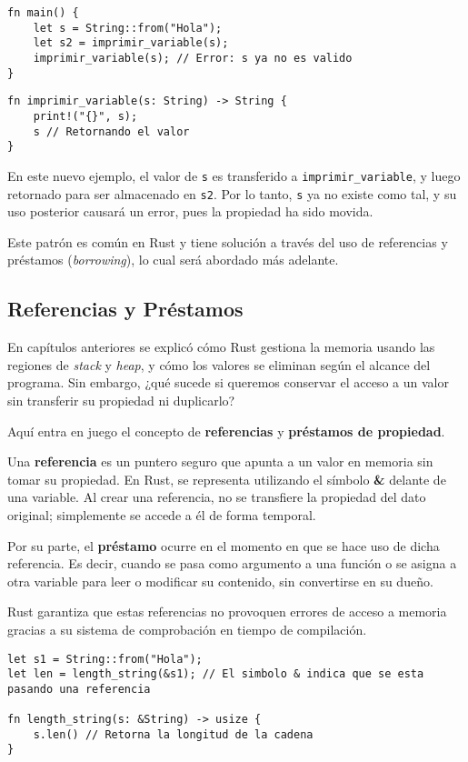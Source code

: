 \documentclass[12pt]{article}
\begin{document}
\begin{lstlisting}[style=ruststyle]
fn main() {
	let s = String::from("Hola");
	let s2 = imprimir_variable(s);
	imprimir_variable(s); // Error: s ya no es valido
}
\end{lstlisting}

\begin{lstlisting}[style=ruststyle]
fn imprimir_variable(s: String) -> String {
	print!("{}", s);
	s // Retornando el valor
}
\end{lstlisting}

En este nuevo ejemplo, el valor de \texttt{s} es transferido a \texttt{imprimir\_variable}, y luego retornado para ser almacenado en \texttt{s2}. Por lo tanto, \texttt{s} ya no existe como tal, y su uso posterior causará un error, pues la propiedad ha sido movida.

Este patrón es común en Rust y tiene solución a través del uso de referencias y préstamos (\textit{borrowing}), lo cual será abordado más adelante.

\subsection{Referencias y Préstamos}

En capítulos anteriores se explicó cómo Rust gestiona la memoria usando las regiones de \textit{stack} y \textit{heap}, y cómo los valores se eliminan según el alcance del programa. Sin embargo, ¿qué sucede si queremos conservar el acceso a un valor sin transferir su propiedad ni duplicarlo?

Aquí entra en juego el concepto de \textbf{referencias} y \textbf{préstamos de propiedad}.

Una \textbf{referencia} es un puntero seguro que apunta a un valor en memoria sin tomar su propiedad. En Rust, se representa utilizando el símbolo \textbf{\&} delante de una variable. Al crear una referencia, no se transfiere la propiedad del dato original; simplemente se accede a él de forma temporal.

Por su parte, el \textbf{préstamo} ocurre en el momento en que se hace uso de dicha referencia. Es decir, cuando se pasa como argumento a una función o se asigna a otra variable para leer o modificar su contenido, sin convertirse en su dueño.

Rust garantiza que estas referencias no provoquen errores de acceso a memoria gracias a su sistema de comprobación en tiempo de compilación.

\begin{lstlisting}[style=ruststyle]
let s1 = String::from("Hola");
let len = length_string(&s1); // El simbolo & indica que se esta pasando una referencia

fn length_string(s: &String) -> usize {
	s.len() // Retorna la longitud de la cadena
}
\end{lstlisting}
\end{document}
